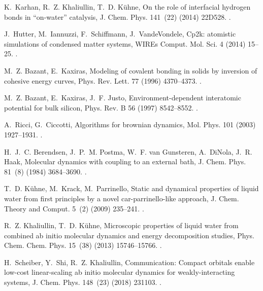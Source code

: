 \documentclass[preprint]{elsarticle}
\begin{document}
\begin{thebibliography}{10}
K.~Karhan, R.~Z. Khaliullin, T.~D. K\"uhne, On the role of interfacial hydrogen
  bonds in ``on-water'' catalysis, J. Chem. Phys. 141~(22) (2014) 22D528.
\newblock \href {https://doi.org/10.1063/1.4902537}
  {}.

J.~Hutter, M.~Iannuzzi, F.~Schiffmann, J.~VandeVondele, Cp2k: atomistic
  simulations of condensed matter systems, WIREs Comput. Mol. Sci. 4 (2014)
  15--25.
\newblock \href {https://doi.org/10.1002/wcms.1159}
  {}.

M.~Z. Bazant, E.~Kaxiras, Modeling of covalent bonding in solids by inversion
  of cohesive energy curves, Phys. Rev. Lett. 77 (1996) 4370--4373.
\newblock \href {https://doi.org/10.1103/PhysRevLett.77.4370}
  {}.

M.~Z. Bazant, E.~Kaxiras, J.~F. Justo, Environment-dependent interatomic
  potential for bulk silicon, Phys. Rev. B 56 (1997) 8542--8552.
\newblock \href {https://doi.org/10.1103/PhysRevB.56.8542}
  {}.

A.~Ricci, G.~Ciccotti, Algorithms for brownian dynamics, Mol. Phys. 101 (2003)
  1927--1931.
\newblock \href {https://doi.org/10.1080/0026897031000108113}
  {}.

H.~J.~C. Berendsen, J.~P.~M. Postma, W.~F. van Gunsteren, A.~DiNola, J.~R.
  Haak, Molecular dynamics with coupling to an external bath, J. Chem. Phys.
  81~(8) (1984) 3684--3690.
\newblock \href {https://doi.org/10.1063/1.448118}
  {}.

T.~D. K\"uhne, M.~Krack, M.~Parrinello, Static and dynamical properties of
  liquid water from first principles by a novel car-parrinello-like approach,
  J. Chem. Theory and Comput. 5~(2) (2009) 235--241.
\newblock \href {https://doi.org/10.1021/ct800417q}
  {}.

R.~Z. Khaliullin, T.~D. K\"uhne, Microscopic properties of liquid water from
  combined ab initio molecular dynamics and energy decomposition studies, Phys.
  Chem. Chem. Phys. 15~(38) (2013) 15746--15766.
\newblock \href {https://doi.org/10.1039/C3CP51039E}
  {}.

H.~Scheiber, Y.~Shi, R.~Z. Khaliullin, Communication: Compact orbitals enable
  low-cost linear-scaling ab initio molecular dynamics for weakly-interacting
  systems, J. Chem. Phys. 148~(23) (2018) 231103.
\newblock \href {https://doi.org/10.1063/1.5029939}
  {}.


\end{thebibliography}
\end{document}
